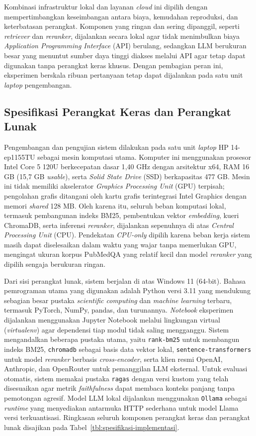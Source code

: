 Kombinasi infrastruktur lokal dan layanan \textit{cloud} ini dipilih dengan mempertimbangkan keseimbangan antara biaya, kemudahan reproduksi, dan keterbatasan perangkat. Komponen yang ringan dan sering dipanggil, seperti \textit{retriever} dan \textit{reranker}, dijalankan secara lokal agar tidak menimbulkan biaya \textit{Application Programming Interface} (API) berulang, sedangkan LLM berukuran besar yang menuntut sumber daya tinggi diakses melalui API agar tetap dapat digunakan tanpa perangkat keras khusus. Dengan pembagian peran ini, eksperimen berskala ribuan pertanyaan tetap dapat dijalankan pada satu unit \textit{laptop} pengembangan.

\subsection{Spesifikasi Perangkat Keras dan Perangkat Lunak}
\label{subsec:spesifikasi-perangkat}

Pengembangan dan pengujian sistem dilakukan pada satu unit \textit{laptop} HP 14-ep1155TU sebagai mesin komputasi utama. Komputer ini menggunakan prosesor Intel Core 5 120U berkecepatan dasar 1{,}40 GHz dengan arsitektur x64, RAM 16 GB (15{,}7 GB \textit{usable}), serta \textit{Solid State Drive} (SSD) berkapasitas 477 GB. Mesin ini tidak memiliki akselerator \textit{Graphics Processing Unit} (GPU) terpisah; pengolahan grafis ditangani oleh kartu grafis terintegrasi Intel Graphics dengan memori \textit{shared} 128 MB. Oleh karena itu, seluruh beban komputasi lokal, termasuk pembangunan indeks BM25, pembentukan vektor \textit{embedding}, kueri ChromaDB, serta inferensi \textit{reranker}, dijalankan sepenuhnya di atas \textit{Central Processing Unit} (CPU). Pendekatan \textit{CPU-only} dipilih karena beban kerja sistem masih dapat diselesaikan dalam waktu yang wajar tanpa memerlukan GPU, mengingat ukuran korpus PubMedQA yang relatif kecil dan model \textit{reranker} yang dipilih sengaja berukuran ringan.

Dari sisi perangkat lunak, sistem berjalan di atas Windows 11 (64-bit). Bahasa pemrograman utama yang digunakan adalah Python versi 3.11 yang mendukung sebagian besar pustaka \textit{scientific computing} dan \textit{machine learning} terbaru, termasuk PyTorch, NumPy, pandas, dan turunannya. \textit{Notebook} eksperimen dijalankan menggunakan Jupyter Notebook melalui lingkungan virtual (\textit{virtualenv}) agar dependensi tiap modul tidak saling mengganggu. Sistem mengandalkan beberapa pustaka utama, yaitu \texttt{rank-bm25} untuk membangun indeks BM25, \texttt{chromadb} sebagai basis data vektor lokal, \texttt{sentence-transformers} untuk model \textit{reranker} berbasis \textit{cross-encoder}, serta klien resmi OpenAI, Anthropic, dan OpenRouter untuk pemanggilan LLM eksternal. Untuk evaluasi otomatis, sistem memakai pustaka \texttt{ragas} dengan versi kustom yang telah disesuaikan agar metrik \textit{faithfulness} dapat membaca konteks panjang tanpa pemotongan agresif. Model LLM lokal dijalankan menggunakan \texttt{Ollama} sebagai \textit{runtime} yang menyediakan antarmuka HTTP sederhana untuk model Llama versi terkuantisasi. Ringkasan seluruh komponen perangkat keras dan perangkat lunak disajikan pada Tabel~\ref{tbl:spesifikasi-implementasi}.

